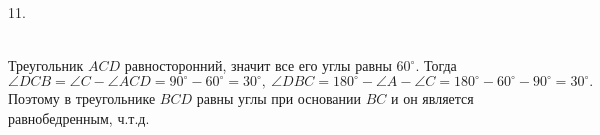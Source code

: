11. \begin{figure}[ht!]
\end{figure}\\
Треугольник $ACD$ равносторонний, значит все его углы равны $60^\circ.$ Тогда $\angle DCB=\angle C-\angle ACD=90^\circ-60^\circ=30^\circ,\ \angle DBC=180^\circ-\angle A-\angle C=180^\circ-60^\circ-90^\circ=30^\circ.$ Поэтому в треугольнике $BCD$ равны углы при основании $BC$ и он является равнобедренным, ч.т.д.\\
